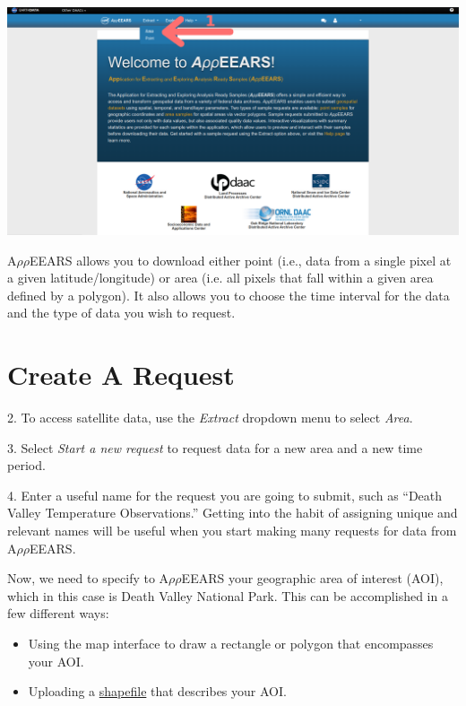 \documentclass[oneside,a4paper,11pt,explicit]{book}
\begin{document}
\vspace{.5em}

\centerline{\includegraphics[width=\textwidth]{AppEEARShome.png}}

A$\rho\rho$EEARS allows you to download either point (i.e., data from a single pixel at a given latitude/longitude) or area (i.e. all pixels that fall within a given area defined by a polygon). It also allows you to choose the time interval for the data and the type of data you wish to request.  

\section{Create A Request}
2. To access satellite data, use the \textit{Extract} dropdown menu to select \textit{Area}. 

3. Select \textit{Start a new request} to request data for a new area and a new time period.

4. Enter a useful name for the request you are going to submit, such as ``Death Valley Temperature Observations.'' Getting into the habit of assigning unique and relevant names will be useful when you start making many requests for data from A$\rho\rho$EEARS.

\vspace{1em}

Now, we need to specify to A$\rho\rho$EEARS your geographic area of interest (AOI), which in this case is Death Valley National Park. This can be accomplished in a few different ways:

\begin{itemize}
	\item Using the map interface to draw a rectangle or polygon that encompasses your AOI.
	\item Uploading a \href{https://en.wikipedia.org/wiki/Shapefile}{shapefile} that describes your AOI.	
\end{itemize}
\end{document}
